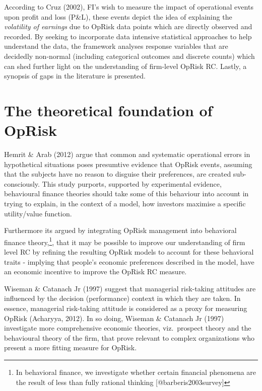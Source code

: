 \documentclass{DissertateUSU}
\begin{document}
According to Cruz (2002), FI's wish to measure the impact of operational
events upon profit and loss (P\&L), these events depict the idea of
explaining the \emph{volatility of earnings} due to OpRisk data points
which are directly observed and recorded. By seeking to incorporate data
intensive statistical approaches to help understand the data, the
framework analyses response variables that are decidedly non-normal
(including categorical outcomes and discrete counts) which can shed
further light on the understanding of firm-level OpRisk RC. Lastly, a
synopsis of gaps in the literature is presented.

\section{The theoretical foundation of OpRisk}
\label{sec:The theoretical foundation of OpRisk}

Hemrit \& Arab (2012) argue that common and systematic operational
errors in hypothetical situations poses presumtive evidence that OpRisk
events, assuming that the subjects have no reason to disguise their
preferences, are created sub-consciously. This study purports, supported
by experimental evidence, behavioural finance theories should take some
of this behaviour into account in trying to explain, in the context of a
model, how investors maximise a specific utility/value function.\medskip

Furthermore its argued by integrating OpRisk management into behavioral
finance
theory,\footnote{In behavioral finance, we investigate whether certain financial phenomena are the result of less than fully rational thinking [@barberis2003survey]},
that it may be possible to improve our understanding of firm level RC by
refining the resulting OpRisk models to account for these behavioral
traits - implying that people's economic preferences described in the
model, have an economic incentive to improve the OpRisk RC measure.
\medskip

Wiseman \& Catanach Jr (1997) suggest that managerial risk-taking
attitudes are influenced by the decision (performance) context in which
they are taken. In essence, managerial risk-taking attitude is
considered as a proxy for measuring OpRisk (Acharyya, 2012). In so
doing, Wiseman \& Catanach Jr (1997) investigate more comprehensive
economic theories, viz.~prospect theory and the behavioural theory of
the firm, that prove relevant to complex organizations who present a
more fitting measure for OpRisk.\medskip 
\end{document}
